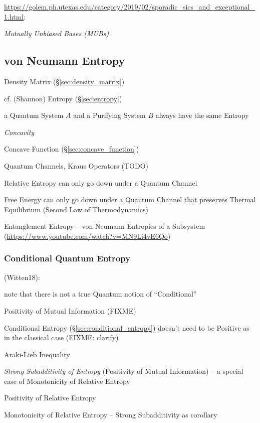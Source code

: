 \url{https://golem.ph.utexas.edu/category/2019/02/sporadic_sics_and_exceptional_1.html}:

\emph{Mutually Unbiased Bases (MUBs)}



\subsection{von Neumann Entropy}\label{sec:vonneumann_entropy}

Density Matrix (\S\ref{sec:density_matrix})

cf. (Shannon) Entropy (\S\ref{sec:entropy})

a Quantum System $A$ and a Purifying System $B$ always have the same Entropy

\emph{Concavity}

Concave Function (\S\ref{sec:concave_function})

Quantum Channels, Kraus Operators (TODO)

Relative Entropy can only go down under a Quantum Channel

Free Energy can only go down under a Quantum Channel that preserves Thermal
Equilibrium (Second Law of Thermodynamics)

Entanglement Entropy -- von Neumann Entropies of a Subsystem
(\url{https://www.youtube.com/watch?v=MN9Li4vE6Qo})



\subsubsection{Conditional Quantum Entropy}
\label{sec:conditional_quantum_entropy}

(Witten18):

note that there is not a true Quantum notion of ``Conditional''

Positivity of Mutual Information (FIXME)

Conditional Entropy (\S\ref{sec:conditional_entropy}) doesn't need to be
Positive as in the classical case (FIXME: clarify)

Araki-Lieb Inequality

\emph{Strong Subadditivity of Entropy} (Positivity of Mutual Information) --
a special case of Monotonicity of Relative Entropy

Positivity of Relative Entropy

Monotonicity of Relative Entropy -- Strong Subadditivity as corollary
